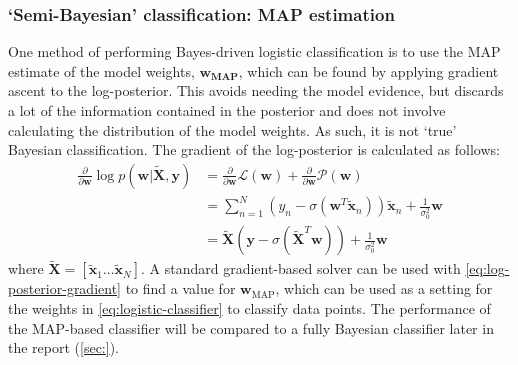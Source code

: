 \documentclass[a4paper]{article}
\begin{document}
    \subsubsection{`Semi-Bayesian' classification: MAP estimation}
    One method of performing Bayes-driven logistic classification is to use the MAP estimate of the model weights, $\bm{w_\text{MAP}}$, which can be found by applying gradient ascent to the log-posterior.
    This avoids needing the model evidence, but discards a lot of the information contained in the posterior and does not involve calculating the distribution of the model weights.
    As such, it is not `true' Bayesian classification.
    The gradient of the log-posterior is calculated as follows:
    \begin{align}
        \frac{\partial}{\partial \bm{w}} \log p(\bm{w} | \tilde{\bm{X}}, \bm{y}) &= \frac{\partial}{\partial \bm{w}} \mathcal{L}(\bm{w}) + \frac{\partial}{\partial \bm{w}} \mathcal{P}(\bm{w}) \nonumber \\
        &= \sum_{n=1}^{N} \left(y_n - \sigma(\bm{w}^T \tilde{\bm{x}}_n) \right)  \tilde{\bm{x}}_n  + \frac{1}{\sigma_0^2} \bm{w} \nonumber \\
        &= \tilde{\bm{X}} (\textbf{y} - \sigma(\tilde{\bm{X}}^T \bm{w})) + \frac{1}{\sigma_0^2} \bm{w}
        \label{eq:log-posterior-gradient}
    \end{align}
    where $\tilde{\bm{X}} = [\tilde{\bm{x}}_1 \dots \tilde{\bm{x}}_N]$.
    A standard gradient-based solver can be used with \autoref{eq:log-posterior-gradient} to find a value for $\bm{w}_\text{MAP}$, which can be used as a setting for the weights in \autoref{eq:logistic-classifier} to classify data points.
    The performance of the MAP-based classifier will be compared to a fully Bayesian classifier later in the report (\autoref{sec:}).
\end{document}
